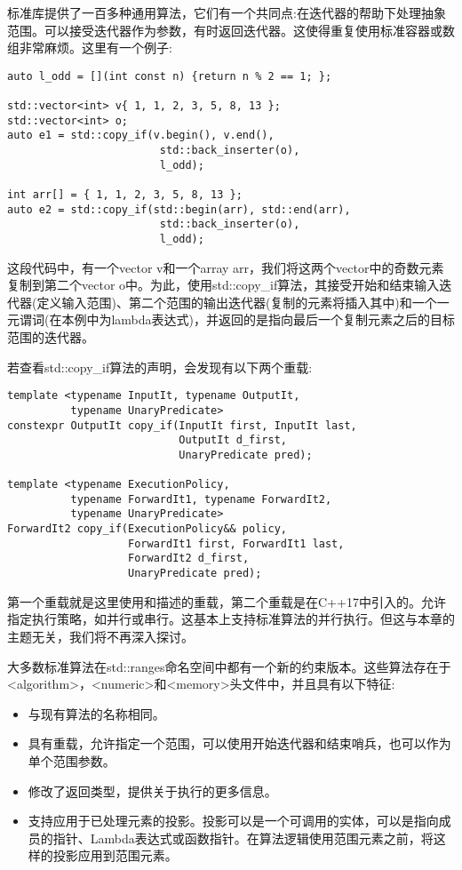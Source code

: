 标准库提供了一百多种通用算法，它们有一个共同点:在迭代器的帮助下处理抽象范围。可以接受迭代器作为参数，有时返回迭代器。这使得重复使用标准容器或数组非常麻烦。这里有一个例子:

\begin{lstlisting}[style=styleCXX]
auto l_odd = [](int const n) {return n % 2 == 1; };

std::vector<int> v{ 1, 1, 2, 3, 5, 8, 13 };
std::vector<int> o;
auto e1 = std::copy_if(v.begin(), v.end(),
						std::back_inserter(o),
						l_odd);
						
int arr[] = { 1, 1, 2, 3, 5, 8, 13 };
auto e2 = std::copy_if(std::begin(arr), std::end(arr),
						std::back_inserter(o),
						l_odd);
\end{lstlisting}

这段代码中，有一个vector v和一个array arr，我们将这两个vector中的奇数元素复制到第二个vector o中。为此，使用std::copy\_if算法，其接受开始和结束输入迭代器(定义输入范围)、第二个范围的输出迭代器(复制的元素将插入其中)和一个一元谓词(在本例中为lambda表达式)，并返回的是指向最后一个复制元素之后的目标范围的迭代器。

若查看std::copy\_if算法的声明，会发现有以下两个重载:

\begin{lstlisting}[style=styleCXX]
template <typename InputIt, typename OutputIt,
		  typename UnaryPredicate>
constexpr OutputIt copy_if(InputIt first, InputIt last,
						   OutputIt d_first,
						   UnaryPredicate pred);
						   
template <typename ExecutionPolicy,
		  typename ForwardIt1, typename ForwardIt2,
		  typename UnaryPredicate>
ForwardIt2 copy_if(ExecutionPolicy&& policy,
				   ForwardIt1 first, ForwardIt1 last,
				   ForwardIt2 d_first,
				   UnaryPredicate pred);
\end{lstlisting}

第一个重载就是这里使用和描述的重载，第二个重载是在C++17中引入的。允许指定执行策略，如并行或串行。这基本上支持标准算法的并行执行。但这与本章的主题无关，我们将不再深入探讨。

大多数标准算法在std::ranges命名空间中都有一个新的约束版本。这些算法存在于<algorithm>，<numeric>和<memory>头文件中，并且具有以下特征:

\begin{itemize}
\item
与现有算法的名称相同。

\item
具有重载，允许指定一个范围，可以使用开始迭代器和结束哨兵，也可以作为单个范围参数。

\item
修改了返回类型，提供关于执行的更多信息。

\item
支持应用于已处理元素的投影。投影可以是一个可调用的实体，可以是指向成员的指针、Lambda表达式或函数指针。在算法逻辑使用范围元素之前，将这样的投影应用到范围元素。
\end{itemize}

